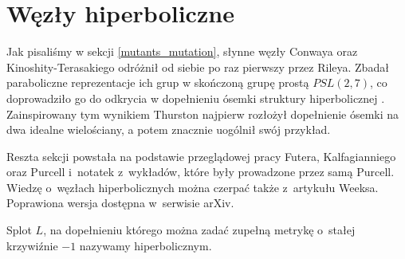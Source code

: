 \section{Węzły hiperboliczne} %
\label{sec:hyperbolic}
Jak pisaliśmy w sekcji \ref{mutants_mutation}, słynne węzły Conwaya oraz Kinoshity-Terasakiego odróżnił od siebie po raz pierwszy przez Rileya.
Zbadał paraboliczne reprezentacje ich grup w skończoną grupę prostą $PSL(2, 7)$, co doprowadziło go do odkrycia w dopełnieniu ósemki struktury hiperbolicznej \cite{riley75}.
Zainspirowany tym wynikiem Thurston najpierw rozłożył dopełnienie ósemki na dwa idealne wielościany, a potem znacznie uogólnił swój przykład.

Reszta sekcji powstała na podstawie przeglądowej pracy \cite{purcell19} Futera, Kalfagianniego oraz Purcell i~notatek z~wykładów, które były prowadzone przez samą Purcell.
Wiedzę o~węzłach hiperbolicznych można czerpać także z~artykułu \cite{weeks05} Weeksa.
Poprawiona wersja dostępna w~serwisie arXiv.








\begin{definition}[hiperboliczny]
    Splot $L$, na dopełnieniu którego można zadać zupełną metrykę o~stałej krzywiźnie $-1$ nazywamy hiperbolicznym.
\end{definition}

